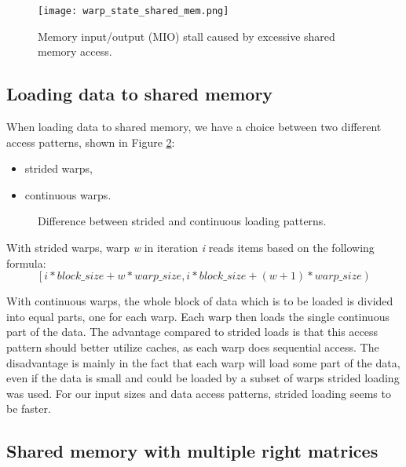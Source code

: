 \begin{figure}[ht]
	\centering
	\texttt{[image: warp\_state\_shared\_mem.png]}
	\caption{Memory input/output (MIO) stall caused by excessive shared memory access.}
	\label{fig:warp_state_shared_mem}
\end{figure}

\subsection{Loading data to shared memory}

When loading data to shared memory, we have a choice between two different access patterns, shown in Figure \ref{fig:shared_memory_loading_patterns}:
\begin{itemize}
	\item strided warps,
	\item continuous warps.
\end{itemize}

\begin{figure}[ht]
	\centering
	\def\svgwidth{0.6\textwidth}
	
	\caption{Difference between strided and continuous loading patterns.}
	\label{fig:shared_memory_loading_patterns}
\end{figure}

With strided warps, warp \textit{w} in iteration \textit{i} reads items based on the following formula:
\[ \left[i * block\_size + w * warp\_size, i * block\_size + (w + 1) * warp\_size\right) \]

With continuous warps, the whole block of data which is to be loaded is divided into equal parts, one for each warp. Each warp then loads the single continuous part of the data. The advantage compared to strided loads is that this access pattern should better utilize caches, as each warp does sequential access. The disadvantage is mainly in the fact that each warp will load some part of the data, even if the data is small and could be loaded by a subset of warps strided loading was used. For our input sizes and data access patterns, strided loading seems to be faster. %

\subsection{Shared memory with multiple right matrices}


